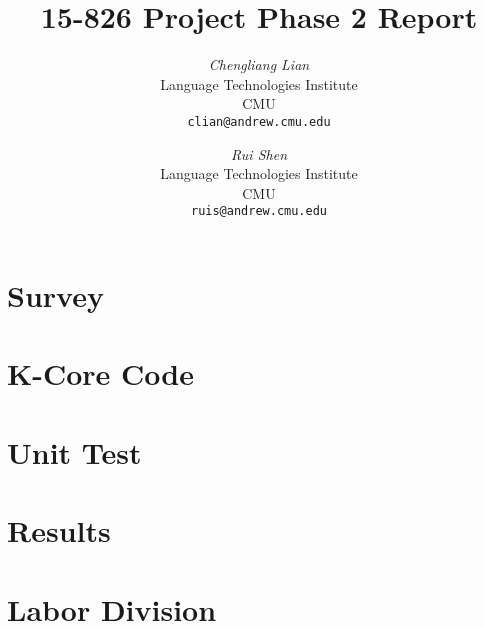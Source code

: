 \documentclass[12pt]{article}
\begin{document}
\newcommand{\beq}{\begin{equation}}
\newcommand{\eeq}{\end{equation}}
\newcommand{\bit}{\begin{itemize*}}
\newcommand{\eit}{\end{itemize*}}
\newcommand{\goal}[1]{ {\noindent {$\Rightarrow$} \em {#1} } }
\newcommand{\hide}[1]{}
\newcommand{\comment}[1]{ {\footnotesize {#1} } }
\newtheorem{lemma}{Lemma}
\newtheorem{theorem}{Theorem}
\newtheorem{proof}{Proof}
\newtheorem{defn}{Definition}
\newtheorem{algo}{Algorithm}
\newtheorem{observation}{Observation}

\title{15-826 Project Phase 2 Report}


\author{ {\em Chengliang Lian} \\
	    Language Technologies Institute \\
	    CMU\\
	    {\tt clian@andrew.cmu.edu}
	 \and
	 {\em Rui Shen} \\
	     Language Technologies Institute \\
	     CMU\\
	     {\tt ruis@andrew.cmu.edu}
	     }


\maketitle

\section{Survey}
    \label{sec:survey}
    

\section{K-Core Code}
    \label{sec:KCoreCode}
    
    
\section{Unit Test}
    \label{sec:Unit Test}
    

\section{Results}
    \label{sec:results}
    

\section{Labor Division}
    \label{sec:labordivision}
    
    
\end{document}
